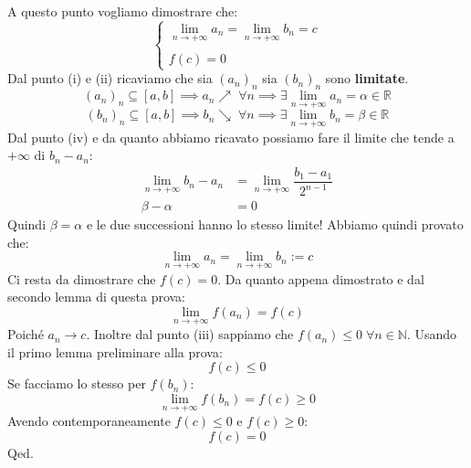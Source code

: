 {  A questo punto vogliamo dimostrare che:
  \begin{equation*}
    \begin{cases*}
      \lim \limits_{n \to +\infty} a_n = \lim \limits_{n \to +\infty} b_n = c\\
      \\
      f(c) = 0
    \end{cases*}
  \end{equation*}
    Dal punto (i) e (ii) ricaviamo che sia $(a_n)_n$ sia $(b_n)_n$ sono 
    \textbf{limitate}.
    \begin{equation*}
      (a_n)_n \subseteq [a, b] \implies a_n \nearrow \; \forall n \implies 
      \exists \lim_{n \to +\infty} a_n = \alpha \in \mathbb{R}
    \end{equation*}
    \begin{equation*}
      (b_n)_n \subseteq [a, b] \implies b_n \searrow \; \forall n \implies 
      \exists \lim_{n \to +\infty} b_n = \beta \in \mathbb{R}
    \end{equation*}
    Dal punto (iv) e da quanto abbiamo ricavato possiamo fare il limite che 
    tende a $+\infty$ di $b_n - a_n$:
    \begin{align*}
      \lim_{n \to +\infty} b_n - a_n &= \lim_{n \to +\infty} \dfrac{b_1 - 
      a_1}{2^{n-1}}\\
      \beta - \alpha &= 0
    \end{align*}
    Quindi $\beta = \alpha$ e le due successioni hanno lo stesso limite! 
    Abbiamo quindi provato che:
    \begin{equation*}
      \lim \limits_{n \to +\infty} a_n = \lim \limits_{n \to +\infty} b_n := c
    \end{equation*}
    Ci resta da dimostrare che $f(c) = 0$. Da quanto appena dimostrato e dal 
    secondo lemma di questa prova:
    \begin{equation*}
      \lim \limits_{n \to +\infty} f(a_n) = f(c)
    \end{equation*}
    Poiché $a_n \to c$. Inoltre dal punto (iii) sappiamo che $f(a_n) \leq 0 \; 
    \forall n \in \mathbb{N}$. Usando il primo lemma preliminare alla prova:
    \begin{equation*}
      f(c) \leq 0
    \end{equation*}
    Se facciamo lo stesso per $f(b_n)$:
    \begin{equation*}
      \lim \limits_{n \to +\infty} f(b_n) = f(c) \geq 0
    \end{equation*}
    Avendo contemporaneamente $f(c) \leq 0$ e $f(c) \geq 0$:
    \begin{equation*}
      f(c) = 0
    \end{equation*}
    \hfill Qed.
}

